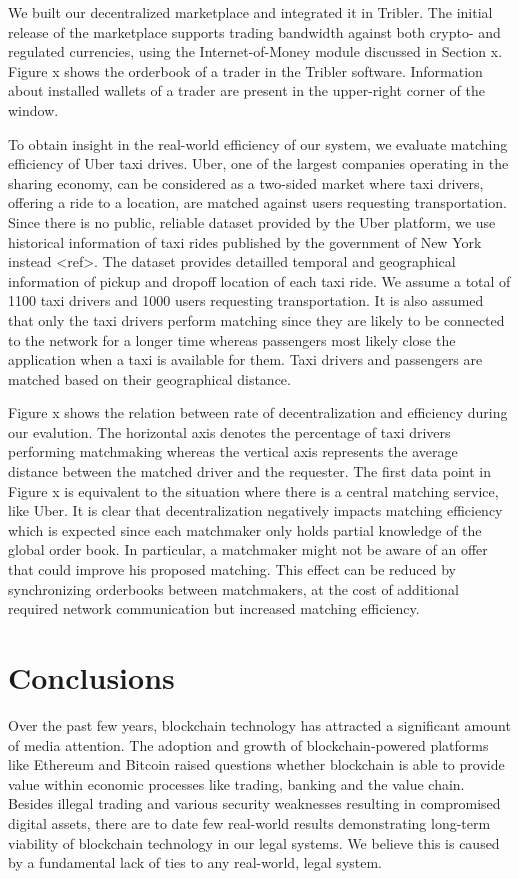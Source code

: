 \documentclass[USenglish]{article}
\begin{document}
We built our decentralized marketplace and integrated it in Tribler.
The initial release of the marketplace supports trading bandwidth against both crypto- and regulated currencies, using the Internet-of-Money module discussed in Section x.
Figure x shows the orderbook of a trader in the Tribler software.
Information about installed wallets of a trader are present in the upper-right corner of the window.

To obtain insight in the real-world efficiency of our system, we evaluate matching efficiency of Uber taxi drives.
Uber, one of the largest companies operating in the sharing economy, can be considered as a two-sided market where taxi drivers, offering a ride to a location, are matched against users requesting transportation.
Since there is no public, reliable dataset provided by the Uber platform, we use historical information of taxi rides published by the government of New York instead <ref>.
The dataset provides detailled temporal and geographical information of pickup and dropoff location of each taxi ride.
We assume a total of 1100 taxi drivers and 1000 users requesting transportation.
It is also assumed that only the taxi drivers perform matching since they are likely to be connected to the network for a longer time whereas passengers most likely close the application when a taxi is available for them.
Taxi drivers and passengers are matched based on their geographical distance.

Figure x shows the relation between rate of decentralization and efficiency during our evalution.
The horizontal axis denotes the percentage of taxi drivers performing matchmaking whereas the vertical axis represents the average distance between the matched driver and the requester.
The first data point in Figure x is equivalent to the situation where there is a central matching service, like Uber.
It is clear that decentralization negatively impacts matching efficiency which is expected since each matchmaker only holds partial knowledge of the global order book.
In particular, a matchmaker might not be aware of an offer that could improve his proposed matching.
This effect can be reduced by synchronizing orderbooks between matchmakers, at the cost of additional required network communication but increased matching efficiency.

\section{Conclusions}

Over the past few years, blockchain technology has attracted a significant amount of media attention.
The adoption and growth of blockchain-powered platforms like Ethereum and Bitcoin raised questions whether blockchain is able to provide value within economic processes like trading, banking and the value chain.
Besides illegal trading and various security weaknesses resulting in compromised digital assets, there are to date few real-world results demonstrating long-term viability of blockchain technology in our legal systems.
We believe this is caused by a fundamental lack of ties to any real-world, legal system.
\end{document}
